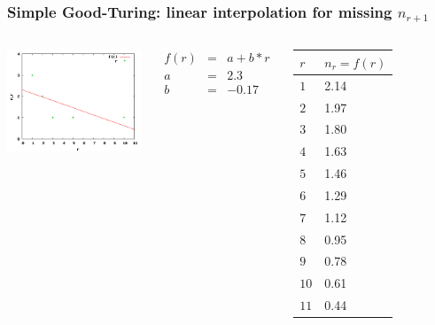 \documentclass{beamer}
\begin{document}
\begin{frame}
\frametitle{Simple Good-Turing: linear interpolation for missing $n_{r+1}$}
\begin{columns}[l]
\includegraphics[scale=0.55]{figures/fit.png}
{\small
\begin{eqnarray*}
f(r) & = & a + b * r \\
a & = & 2.3 \\
b & = & -0.17 
\end{eqnarray*}
\begin{tabular}{ll}
\hline
$r$ & $n_r = f(r)$  \\
\hline
$1$ & 2.14 \\
$2$ & 1.97 \\
$3$ & 1.80 \\
$4$ & 1.63 \\
$5$ & 1.46 \\
$6$ & 1.29 \\
$7$ & 1.12 \\
$8$ & 0.95 \\
$9$ & 0.78 \\
$10$ & 0.61 \\
$11$ & 0.44 \\
\hline
\end{tabular}
}
\end{columns}
\end{frame}
\end{document}
